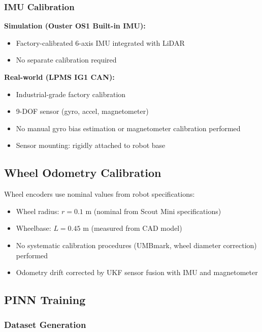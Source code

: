 \subsubsection{IMU Calibration}

\textbf{Simulation (Ouster OS1 Built-in IMU):}
\begin{itemize}
    \item Factory-calibrated 6-axis IMU integrated with LiDAR
    \item No separate calibration required
\end{itemize}

\textbf{Real-world (LPMS IG1 CAN):}
\begin{itemize}
    \item Industrial-grade factory calibration
    \item 9-DOF sensor (gyro, accel, magnetometer)
    \item No manual gyro bias estimation or magnetometer calibration performed
    \item Sensor mounting: rigidly attached to robot base
\end{itemize}

\subsection{Wheel Odometry Calibration}

Wheel encoders use nominal values from robot specifications:

\begin{itemize}
    \item Wheel radius: $r = 0.1$ m (nominal from Scout Mini specifications)
    \item Wheelbase: $L = 0.45$ m (measured from CAD model)
    \item No systematic calibration procedures (UMBmark, wheel diameter correction) performed
    \item Odometry drift corrected by UKF sensor fusion with IMU and magnetometer
\end{itemize}

\subsection{PINN Training}

\subsubsection{Dataset Generation}

